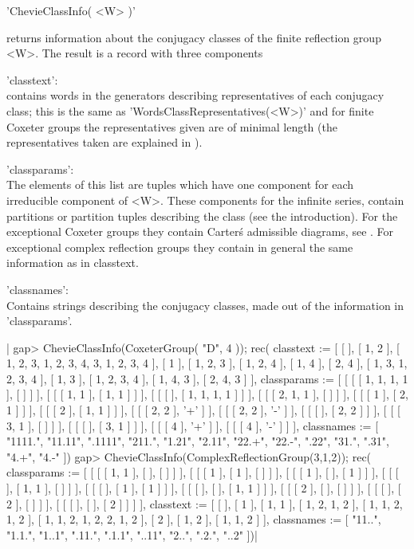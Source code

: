 
'ChevieClassInfo( <W> )'

returns information about the conjugacy classes of the finite reflection
group <W>. The  result is a record with  three components\:\

'classtext':\\   contains    words   in   the    generators   describing
     representatives   of  each  conjugacy  class;  this  is  the  same  as
     'WordsClassRepresentatives(<W>)'  and  for  finite  Coxeter groups the
     representatives given are of minimal length (the representatives taken
     are explained in \cite{GM97}).

'classparams':\\   The elements of this list are tuples which have one
     component for  each irreducible component of  <W>. These components
     for  the infinite  series, contain  partitions or  partition tuples
     describing the  class (see  the introduction). For  the exceptional
     Coxeter  groups they  contain  Carter\'s  admissible diagrams,  see
     \cite{Car72}.  For  exceptional   complex  reflection  groups  they
     contain in general the same information as in classtext.

'classnames':\\ Contains strings describing  the conjugacy classes, made
     out of the information in 'classparams'.

|    gap> ChevieClassInfo(CoxeterGroup( "D", 4 ));
    rec(
      classtext :=
       [ [  ], [ 1, 2 ], [ 1, 2, 3, 1, 2, 3, 4, 3, 1, 2, 3, 4 ], [ 1 ],
          [ 1, 2, 3 ], [ 1, 2, 4 ], [ 1, 4 ], [ 2, 4 ],
          [ 1, 3, 1, 2, 3, 4 ], [ 1, 3 ], [ 1, 2, 3, 4 ], [ 1, 4, 3 ],
          [ 2, 4, 3 ] ],
      classparams :=
       [ [ [ [ 1, 1, 1, 1 ], [  ] ] ], [ [ [ 1, 1 ], [ 1, 1 ] ] ],
          [ [ [  ], [ 1, 1, 1, 1 ] ] ], [ [ [ 2, 1, 1 ], [  ] ] ],
          [ [ [ 1 ], [ 2, 1 ] ] ], [ [ [ 2 ], [ 1, 1 ] ] ],
          [ [ [ 2, 2 ], '+' ] ], [ [ [ 2, 2 ], '-' ] ],
          [ [ [  ], [ 2, 2 ] ] ], [ [ [ 3, 1 ], [  ] ] ],
          [ [ [  ], [ 3, 1 ] ] ], [ [ [ 4 ], '+' ] ], [ [ [ 4 ], '-' ] ] ],
      classnames := [ "1111.", "11.11", ".1111", "211.", "1.21", "2.11",
          "22.+", "22.-", ".22", "31.", ".31", "4.+", "4.-" ])
    gap> ChevieClassInfo(ComplexReflectionGroup(3,1,2));
    rec(
      classparams :=
       [ [ [ [ 1, 1 ], [  ], [  ] ] ], [ [ [ 1 ], [ 1 ], [  ] ] ],
          [ [ [ 1 ], [  ], [ 1 ] ] ], [ [ [  ], [ 1, 1 ], [  ] ] ],
          [ [ [  ], [ 1 ], [ 1 ] ] ], [ [ [  ], [  ], [ 1, 1 ] ] ],
          [ [ [ 2 ], [  ], [  ] ] ], [ [ [  ], [ 2 ], [  ] ] ],
          [ [ [  ], [  ], [ 2 ] ] ] ],
      classtext :=
       [ [  ], [ 1 ], [ 1, 1 ], [ 1, 2, 1, 2 ], [ 1, 1, 2, 1, 2 ],
          [ 1, 1, 2, 1, 2, 2, 1, 2 ], [ 2 ], [ 1, 2 ], [ 1, 1, 2 ] ],
      classnames := [ "11..", "1.1.", "1..1", ".11.", ".1.1", "..11",
          "2..", ".2.", "..2" ])|


